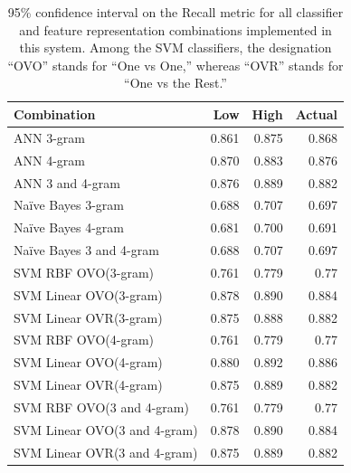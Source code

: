 \documentclass[conference]{sig-alternate-05-2015}
\begin{document}
\begin{table}
  \centering
  \begin{tabular}{| l | r | r | r |}
    \hline
    \textbf{Combination} & \textbf{Low} & \textbf{High} & \textbf{Actual} \\
    \hline\hline
    ANN 3-gram & 0.861 & 0.875 & 0.868 \\
    \hline
    ANN 4-gram & 0.870 & 0.883 & 0.876 \\
    \hline
    ANN 3 and 4-gram & 0.876 & 0.889 & 0.882 \\
    \hline
    Na\"ive Bayes 3-gram & 0.688 & 0.707 & 0.697 \\
    \hline
    Na\"ive Bayes 4-gram & 0.681 & 0.700 & 0.691 \\
    \hline
    Na\"ive Bayes 3 and 4-gram & 0.688 & 0.707 & 0.697 \\
    \hline
    SVM RBF OVO(3-gram) & 0.761 & 0.779 & 0.77 \\
    \hline
    SVM Linear OVO(3-gram) & 0.878 & 0.890 & 0.884 \\
    \hline
    SVM Linear OVR(3-gram) & 0.875 & 0.888 & 0.882 \\
    \hline
    SVM RBF OVO(4-gram) & 0.761 & 0.779 & 0.77 \\
    \hline
    SVM Linear OVO(4-gram) & 0.880 & 0.892 & 0.886 \\
    \hline
    SVM Linear OVR(4-gram) & 0.875 & 0.889 & 0.882 \\
    \hline
    SVM RBF OVO(3 and 4-gram) & 0.761 & 0.779 & 0.77 \\
    \hline
    SVM Linear OVO(3 and 4-gram) & 0.878 & 0.890 & 0.884 \\
    \hline
    SVM Linear OVR(3 and 4-gram) & 0.875 & 0.889 & 0.882 \\
    \hline
  \end{tabular}
  \caption{95\% confidence interval on the Recall metric for all classifier and
  feature representation combinations implemented in this system. Among the SVM
  classifiers, the designation ``OVO'' stands for ``One vs One,'' whereas
  ``OVR'' stands for ``One vs the Rest.''}
  \label{tab:stat_sig}
\end{table}
\end{document}

